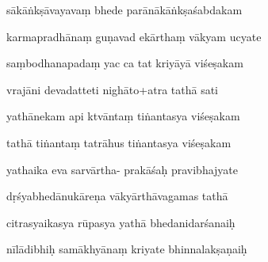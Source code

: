 \documentclass[article,12pt,a4paper]{memoir}%
\newcounter{parCount}
\begin{document}
	  
	  \pstart {} sākāṅkṣāvayavaṃ bhede parānākāṅkṣaśabdakam 
	{}
	\pend%
      

	  
	  \pstart \leavevmode%
	karmapradhānaṃ guṇavad ekārthaṃ vākyam ucyate 
	{}
	\pend%
      

	  
	  \pstart {} saṃbodhanapadaṃ yac ca tat kriyāyā viśeṣakam 
	{}
	\pend%
      

	  
	  \pstart \leavevmode%
	vrajāni devadatteti nighāto+atra tathā sati 
	{}
	\pend%
      

	  
	  \pstart {} yathānekam api ktvāntaṃ tiṅantasya viśeṣakam 
	{}
	\pend%
      

	  
	  \pstart \leavevmode%
	tathā tiṅantaṃ tatrāhus tiṅantasya viśeṣakam 
	{}
	\pend%
      

	  
	  \pstart {} yathaika eva sarvārtha- prakāśaḥ pravibhajyate 
	{}
	\pend%
      

	  
	  \pstart \leavevmode%
	dṛśyabhedānukāreṇa vākyārthāvagamas tathā 
	{}
	\pend%
      

	  
	  \pstart {} citrasyaikasya rūpasya yathā bhedanidarśanaiḥ 
	{}
	\pend%
      

	  
	  \pstart \leavevmode%
	nīlādibhiḥ samākhyānaṃ kriyate bhinnalakṣaṇaiḥ 
	{}
	\pend%
      
\end{document}
